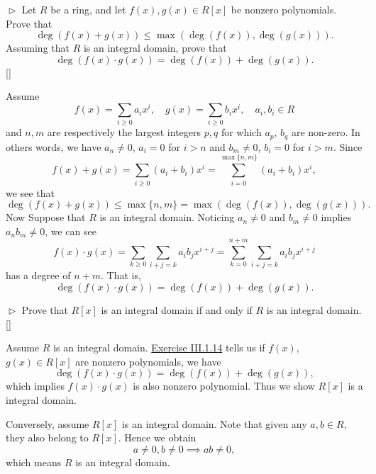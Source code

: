 \documentclass[12pt,letterpaper,boxed]{hmcpset}
\begin{document}
\hypertarget{Exercise III.1.14}{}
\begin{problem}[1.14]
	$\vartriangleright$ Let $R$ be a ring, and let $f(x),g(x)\in R[x]$ be nonzero polynomials. Prove that 
	\[
	\deg(f(x) + g(x))\le\max(\deg(f(x)), \deg(g(x))).
	\]
	Assuming that $R$ is an integral domain, prove that	
	\[
	\deg(f(x)\cdot g(x)) = \deg(f(x)) + \deg(g(x)).
	\] 
	[]
\end{problem}
\begin{solution}
	Assume
	\[
	f(x)=\sum_{i \ge 0} a_{i} x^{i},\quad g(x)=\sum_{i \ge 0} b_{i} x^{i}, \quad a_i,b_i\in R
	\]
	and $n,m$ are respectively the
	largest integers $p,q$ for which $a_p$, $b_q$ are non-zero. In others words, we have $a_n\ne 0$, $a_i=0$ for $i>n$ and $b_m\ne 0$, $b_i=0$ for $i>m$. Since
	\[
	f(x)+g(x)=\sum_{i \ge 0} (a_{i}+b_i) x^{i}=\sum_{i =0}^{\max\{n,m\}} (a_{i}+b_i) x^{i},
	\]
	we see that
	\[
	\deg(f(x) + g(x))\le\max\{n,m\}=\max(\deg(f(x)), \deg(g(x))).
	\]
	Now Suppose that $R$ is an integral domain. Noticing $a_n\ne 0$ and $b_m\ne 0$ implies $a_nb_m\ne 0$, we can see
	\[
	f(x) \cdot g(x) =\sum_{k \geq 0} \sum_{i+j=k} a_{i} b_{j} x^{i+j}=\sum_{k = 0}^{n+m} \sum_{i+j=k} a_{i} b_{j} x^{i+j}
	\]
	has a degree of $n+m$. That is,
	\[
	\deg(f(x)\cdot g(x)) = \deg(f(x)) + \deg(g(x)).
	\]
\end{solution}

\begin{problem}[1.15]
	$\vartriangleright$ Prove that $R[x]$ is an integral domain if and only if $R$ is an integral domain.	[]
\end{problem}
\begin{solution}
	Assume $R$ is an integral domain. \hyperlink{Exercise III.1.14}{Exercise III.1.14} tells us if $f(x)$, $g(x)\in R[x]$ are nonzero polynomials, we have 
	\[
	\deg(f(x)\cdot g(x)) = \deg(f(x)) + \deg(g(x)),
	\]
	which implies $f(x)\cdot g(x)$ is also nonzero polynomial. Thus we show $R[x]$ is a integral domain. 
	
	Conversely, assume $R[x]$ is an integral domain. Note that given any $a,b\in R$, they also belong to $R[x]$. Hence we obtain
	\[
	a\ne0,b\ne0\implies ab\ne0,
	\]
    which means $R$ is an integral domain.
\end{solution}
\end{document}
